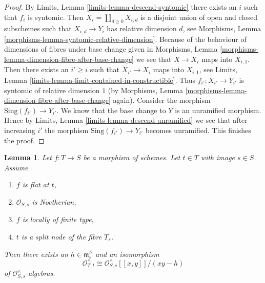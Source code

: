 \documentclass{stacks-project}
\theoremstyle{plain}
\newtheorem{lemma}[subsection]{Lemma}
\theoremstyle{definition}
\theoremstyle{remark}
\numberwithin{equation}{subsection}
\begin{document}
\begin{proof}
By Limits, Lemma \ref{limits-lemma-descend-syntomic}
there exists an $i$ such that $f_i$ is syntomic.
Then $X_i = \coprod_{d \geq 0} X_{i, d}$ is a disjoint union of
open and closed subschemes such that $X_{i, d} \to Y_i$
has relative dimension $d$, see
Morphisms, Lemma \ref{morphisms-lemma-syntomic-relative-dimension}.
Because of the behaviour of dimensions of fibres under base change given in
Morphisms, Lemma \ref{morphisms-lemma-dimension-fibre-after-base-change}
we see that $X \to X_i$ maps into $X_{i, 1}$.
Then there exists an $i' \geq i$ such that $X_{i'} \to X_i$
maps into $X_{i, 1}$, see
Limits, Lemma \ref{limits-lemma-limit-contained-in-constructible}.
Thus $f_{i'} : X_{i'} \to Y_{i'}$ is syntomic of relative dimension $1$
(by Morphisms, Lemma \ref{morphisms-lemma-dimension-fibre-after-base-change}
again).
Consider the morphism $\text{Sing}(f_{i'}) \to Y_{i'}$.
We know that the base change to $Y$ is an unramified morphism.
Hence by Limits, Lemma \ref{limits-lemma-descend-unramified}
we see that after increasing $i'$ the morphism
$\text{Sing}(f_{i'}) \to Y_{i'}$ becomes unramified.
This finishes the proof.
\end{proof}

\begin{lemma}
\label{lemma-formal-local-structure-nodal-family}
Let $f : T \to S$ be a morphism of schemes. Let $t \in T$
with image $s \in S$. Assume
\begin{enumerate}
\item $f$ is flat at $t$,
\item $\mathcal{O}_{S, s}$ is Noetherian,
\item $f$ is locally of finite type,
\item $t$ is a split node of the fibre $T_s$.
\end{enumerate}
Then there exists an $h \in \mathfrak m_s^\wedge$ and an isomorphism
$$
\mathcal{O}_{T, t}^\wedge \cong
\mathcal{O}_{S, s}^\wedge[[x, y]]/(xy - h)
$$
of $\mathcal{O}_{S, s}^\wedge$-algebras.
\end{lemma}
\end{document}
